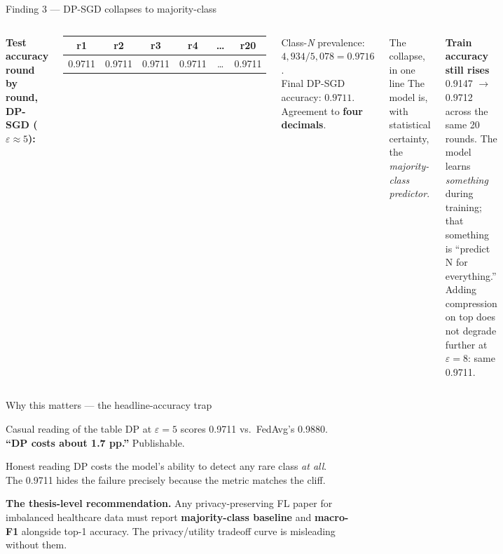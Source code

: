 \documentclass[10pt,aspectratio=169]{beamer}
\begin{document}
\begin{frame}{Finding 3 --- DP-SGD collapses to majority-class}
  \begin{columns}[T]
    \textbf{Test accuracy round by round, DP-SGD ($\varepsilon \approx 5$):}
    \begin{center}
      \footnotesize
      \begin{tabular}{cccccc}
        \toprule
        r1 & r2 & r3 & r4 & \ldots & r20 \\
        \midrule
        0.9711 & 0.9711 & 0.9711 & 0.9711 & \ldots & 0.9711 \\
        \bottomrule
      \end{tabular}
    \end{center}
    \vspace{0.4em}
    Class-\emph{N} prevalence: $4{,}934 / 5{,}078 = 0.9716$.\\
    Final DP-SGD accuracy: $0.9711$.\\
    Agreement to \textbf{four decimals}.
    \begin{block}{The collapse, in one line}
      The model is, with statistical certainty, the \emph{majority-class predictor}.
    \end{block}
    \vspace{0.4em}
    \textbf{Train accuracy still rises} 0.9147 $\to$ 0.9712 across the same 20 rounds. The model learns \emph{something} during training; that something is ``predict N for everything.''
    \vspace{0.4em}
    Adding compression on top does not degrade further at $\varepsilon = 8$: same 0.9711.
  \end{columns}
\end{frame}

\begin{frame}{Why this matters --- the headline-accuracy trap}
  \begin{block}{Casual reading of the table}
    DP at $\varepsilon = 5$ scores 0.9711 vs.\ FedAvg's 0.9880.\\
    \textbf{``DP costs about 1.7 pp.''} Publishable.
  \end{block}
  \vspace{0.5em}
  \begin{block}{Honest reading}
    DP costs the model's ability to detect any rare class \emph{at all}.\\
    The 0.9711 hides the failure precisely because the metric matches the cliff.
  \end{block}
  \vspace{0.5em}
  \textbf{The thesis-level recommendation.} Any privacy-preserving FL paper for imbalanced healthcare data must report \textbf{majority-class baseline} and \textbf{macro-F1} alongside top-1 accuracy. The privacy/utility tradeoff curve is misleading without them.
\end{frame}
\end{document}
